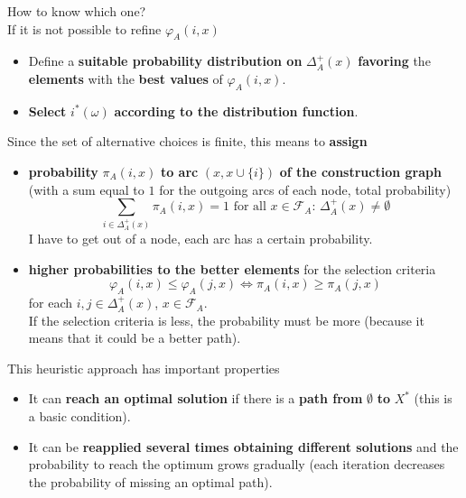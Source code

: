 How to know which one?\\

If it is not possible to refine $\varphi_A (i, x)$
\begin{itemize}
	\item Define a \textbf{suitable probability distribution on} $\Delta_A^+ (x)$ \textbf{favoring} the \textbf{elements} with the \textbf{best values} of $\varphi_A (i, x)$.\\
	
	\item \textbf{Select} $i^\ast (\omega)$ \textbf{according to the distribution function}.\\
\end{itemize}

\newpage

Since the set of alternative choices is finite, this means to \textbf{assign}
\begin{itemize}
	\item \textbf{probability} $\pi_A (i, x)$ \textbf{to arc} $(x, x \cup \{i\})$ \textbf{of the construction graph} (with a sum equal to $1$ for the outgoing arcs of each node, total probability)
	$$ \sum_{i \in \Delta_A^+ (x)} \pi_A (i,x) = 1 \text{ for all } x \in \mathcal{F}_A : \, \Delta_A^+ (x) \neq \emptyset $$
	I have to get out of a node, each arc has a certain probability.\\
	
	\item \textbf{higher probabilities to the better elements} for the selection criteria
	$$ \varphi_A (i,x) \leq \varphi_A (j,x) \Leftrightarrow \pi_A (i,x) \geq \pi_A (j,x) $$
	for each $i, j \in \Delta_A^+ (x)$, $x \in \mathcal{F}_A$.\\
	If the selection criteria is less, the probability must be more (because it means that it could be a better path).\\
\end{itemize}

This heuristic approach has important properties
\begin{itemize}
	\item It can \textbf{reach an optimal solution} if there is a \textbf{path from} $\emptyset$ \textbf{to} $X^\ast$ (this is a basic condition).\\
	
	\item It can be \textbf{reapplied several times obtaining different solutions} and the probability to reach the optimum grows gradually (each iteration decreases the probability of missing an optimal path).\\
\end{itemize}

